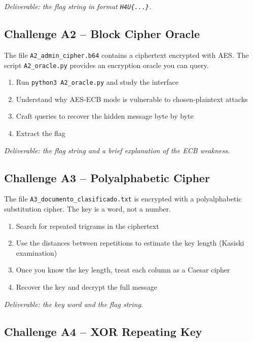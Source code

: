 \documentclass[a4paper, 12pt]{article}
\begin{document}
\textit{Deliverable: the flag string in format \texttt{H4U\{...\}}.}

\subsection{Challenge A2 -- Block Cipher Oracle}

The file \texttt{A2\_admin\_cipher.b64} contains a ciphertext encrypted with AES.
The script \texttt{A2\_oracle.py} provides an encryption oracle you can query.

\begin{enumerate}[leftmargin=2em]
  \item Run \texttt{python3 A2\_oracle.py} and study the interface
  \item Understand why AES-ECB mode is vulnerable to chosen-plaintext attacks
  \item Craft queries to recover the hidden message byte by byte
  \item Extract the flag
\end{enumerate}

\textit{Deliverable: the flag string and a brief explanation of the ECB weakness.}

\subsection{Challenge A3 -- Polyalphabetic Cipher}

The file \texttt{A3\_documento\_clasificado.txt} is encrypted with a polyalphabetic
substitution cipher. The key is a word, not a number.

\begin{enumerate}[leftmargin=2em]
  \item Search for repeated trigrams in the ciphertext
  \item Use the distances between repetitions to estimate the key length (Kasiski examination)
  \item Once you know the key length, treat each column as a Caesar cipher
  \item Recover the key and decrypt the full message
\end{enumerate}

\textit{Deliverable: the key word and the flag string.}

\subsection{Challenge A4 -- XOR Repeating Key}
\end{document}
